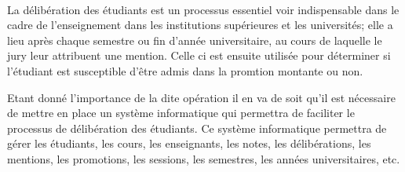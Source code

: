 \begingroup

\paragraph{}
La délibération des étudiants est un processus essentiel voir
indispensable dans le cadre de l'enseignement dans les 
institutions supérieures et les universités; elle a lieu 
après chaque semestre ou fin d'année universitaire, au cours de laquelle
le jury leur attribuent une mention. Celle ci est ensuite utilisée pour
déterminer si l'étudiant est susceptible d'être admis dans la promtion montante ou non.


Etant donné l'importance de la dite opération il en va de soit qu'il est
nécessaire de mettre en place un système informatique qui permettra de
faciliter le processus de délibération des étudiants. Ce système
informatique permettra de gérer les étudiants, les cours, les
enseignants, les notes, les délibérations, les mentions, les
promotions, les sessions, les semestres, les années universitaires, etc.



\endgroup